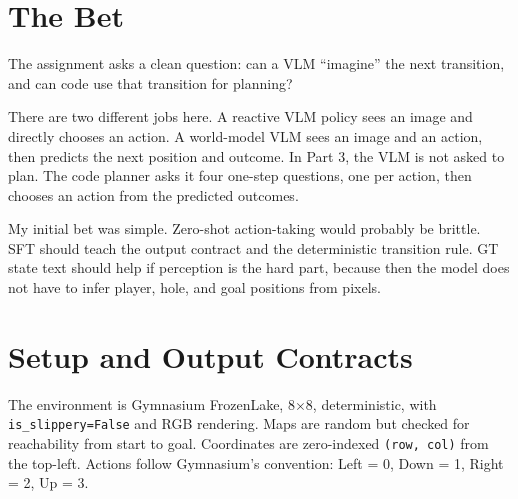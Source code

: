 \documentclass{article}
\newcommand{\code}[1]{\texttt{#1}}
\begin{document}

\begin{abstract}
probably yes.\textsuperscript{*}
\end{abstract}

\section{The Bet}

The assignment asks a clean question: can a VLM ``imagine'' the next transition, and can code use that transition for planning?

There are two different jobs here. A reactive VLM policy sees an image and directly chooses an action. A world-model VLM sees an image and an action, then predicts the next position and outcome. In Part 3, the VLM is not asked to plan. The code planner asks it four one-step questions, one per action, then chooses an action from the predicted outcomes.

My initial bet was simple. Zero-shot action-taking would probably be brittle. SFT should teach the output contract and the deterministic transition rule. GT state text should help if perception is the hard part, because then the model does not have to infer player, hole, and goal positions from pixels.

\section{Setup and Output Contracts}

The environment is Gymnasium FrozenLake, 8$\times$8, deterministic, with \code{is\_slippery=False} and RGB rendering. Maps are random but checked for reachability from start to goal. Coordinates are zero-indexed \code{(row, col)} from the top-left. Actions follow Gymnasium's convention: Left = 0, Down = 1, Right = 2, Up = 3.
\end{document}
